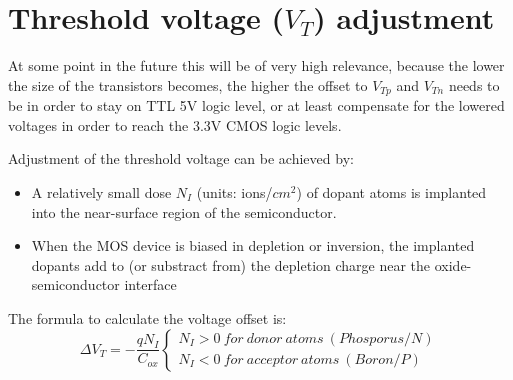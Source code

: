 \section{Threshold voltage ($V_T$) adjustment}
At some point in the future this will be of very high relevance, because the lower the size of the transistors becomes, the higher the offset to $V_{Tp}$ and $V_{Tn}$ needs to be in order to stay on TTL 5V logic level, or at least compensate for the lowered voltages in order to reach the 3.3V CMOS logic levels.

Adjustment of the threshold voltage can be achieved by:
\begin{itemize}
\item A relatively small dose $N_I$ (units: ions/$cm^2$) of dopant atoms is implanted into the near-surface  region of the semiconductor.
\item When the MOS device is biased in depletion or inversion, the implanted dopants add to (or substract from) the depletion charge near the oxide-semiconductor interface
\end{itemize}

The formula to calculate the voltage offset is:
\begin{equation}
\Delta V_T = -\frac{q N_I}{C_{ox}} 
\left\{\begin{matrix}
N_I > 0\ for\ donor\ atoms\ (Phosporus/N) \\
N_I < 0\ for\ acceptor\ atoms\ (Boron/P)
\end{matrix}\right.
\end{equation}

